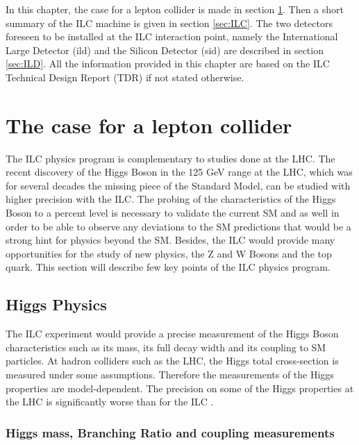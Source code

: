 In this chapter, the case for a lepton collider is made in section \ref{sec:ILC_Physics}. Then a short summary of the ILC machine is given in section \ref{sec:ILC}. The two detectors foreseen to be installed at the ILC interaction point, namely the International Large Detector (\acrshort{ild}) and the Silicon Detector (\acrshort{sid}) are described in section \ref{sec:ILD}. All the information provided in this chapter are based on the ILC Technical Design Report (TDR) \cite{ILC_TDR_Vol1, ILC_TDR_Vol2, ILC_TDR_Vol3.1, ILC_TDR_Vol3.2, ILC_TDR_Vol4} if not stated otherwise.

\section{The case for a lepton collider}
\label{sec:ILC_Physics}

The ILC physics program is complementary to studies done at the LHC. The recent discovery of the Higgs Boson in the 125 GeV range at the LHC, which was for several decades the missing piece of the Standard Model, can be studied with higher precision with the ILC. The probing of the characteristics of the Higgs Boson to a percent level is necessary to validate the current SM and as well in order to be able to observe any deviations to the SM predictions that would be a strong hint for physics beyond the SM. Besides, the ILC would provide many opportunities for the study of new physics, the Z and W Bosons and the top quark. This section will describe few key points of the ILC physics program.

\subsection{Higgs Physics}

The ILC experiment would provide a precise measurement of the Higgs Boson characteristics such as its mass, its full decay width and its coupling to SM particles. At hadron colliders such as the LHC, the Higgs total cross-section is measured under some assumptions. Therefore the measurements of the Higgs properties are model-dependent. The precision on some of the Higgs properties at the LHC is significantly worse than for the ILC \cite{Fujii:2015jha}.

\subsubsection{Higgs mass, Branching Ratio and coupling measurements}

